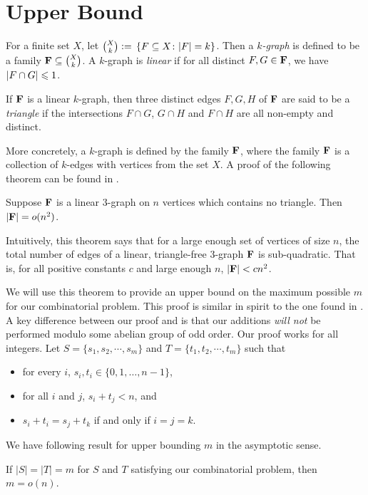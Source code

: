 \section{Upper Bound}

\begin{definition}
	For a finite set $X$, let $\binom{X}{k} {\;\vcentcolon=\;}\left\lbrace F\subseteq X\colon |F| = k \right\rbrace$. Then a {\em $k$-graph} is defined to be a family ${\mathbf F}\subseteq \binom{X}{k}$.
	A $k$-graph is {\em linear} if for all distinct $F,G \in {\mathbf F}$, we have $|F\cap G| \leqslant 1$.
\end{definition}
\begin{definition}
	If ${\mathbf F}$ is a linear $k$-graph, then three distinct edges $F,G,H$ of ${\mathbf F}$ are said to be a {\em triangle} if the intersections $F\cap G$, $G\cap H$ and $F\cap H$ are all non-empty and distinct.
\end{definition}

More concretely, a $k$-graph is defined by the family ${\mathbf F}$, where the family ${\mathbf F}$ is a collection of $k$-edges with vertices from the set $X$. A proof of the following theorem can be found in \cite{EFR86}.
\begin{theorem} 
	\label{thm:RS}
	Suppose $ {\mathbf F} $ is a linear 3-graph on $ n $ vertices which contains no triangle. Then $ \left\vert{\ensuremath{{\mathbf F}}}\right\vert = o(n^2) $. 
\end{theorem}

Intuitively, this theorem says that for a large enough set of vertices of size $n$, the total number of edges of a linear, triangle-free 3-graph ${\mathbf F}$ is sub-quadratic. That is, for all positive constants $c$ and large enough $n$, $|{\mathbf F}| < cn^2$.

We will use this theorem to provide an upper bound on the maximum possible $m$ for our combinatorial problem. This proof is similar in spirit to the one found in \cite{FGV87}. A key difference between our proof and \cite{FGV87} is that our additions {\em will not} be performed modulo some abelian group of odd order. Our proof works for all integers. Let $ S = \{s_1, s_2, \cdots, s_m\} $ and $ T =\{ t_1,t_2, \cdots, t_m\} $ such that 
\begin{itemize}
	\item for every $ i $, $ s_i, t_i \in \{0,1,\dotsc, n-1\} $,
	\item for all $i$ and $j$, $s_i + t_j < n$, and
	\item $ s_i + t_i = s_j + t_k $  if and only if $ i = j = k $.
\end{itemize}
We have following result for upper bounding $ m $ in the asymptotic sense. 
\begin{theorem}
	If $|S| = |T| = m$ for $S$ and $T$ satisfying our combinatorial problem, then $ m = o(n) $.
\end{theorem}  

